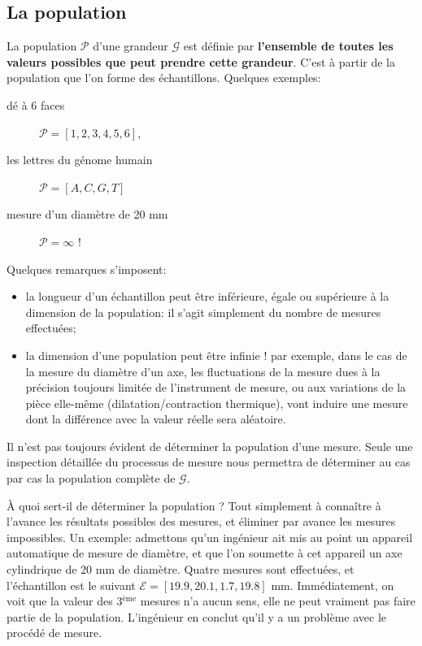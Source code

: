 \documentclass[main.tex]{subfiles}
\begin{document}
\subsection{La population}

La population $\mathcal{P}$ d'une grandeur $\mathcal{G}$ est définie par \textbf{l'ensemble de toutes les valeurs possibles que peut prendre cette grandeur}. C'est à partir de la population que l'on forme des échantillons. Quelques exemples:
\begin{description}
    \item[dé à 6 faces] $\mathcal{P}=[1,2,3,4,5,6]$,
    \item[les lettres du génome humain] $\mathcal{P}=[A,C,G,T]$
    \item[mesure d'un diamètre de 20 mm] $\mathcal{P}=\infty$ !
\end{description}
Quelques remarques s'imposent:
\begin{itemize}
    \item la longueur d'un échantillon peut être inférieure, égale ou supérieure à la dimension de la population: il s'agit simplement du nombre de mesures effectuées;
    \item la dimension d'une population peut être infinie ! par exemple, dans le cas de la mesure du diamètre d'un axe, les fluctuations de la mesure dues à la précision toujours limitée de l'instrument de mesure, ou aux variations de la pièce elle-même (dilatation/contraction thermique), vont induire une mesure dont la différence avec la valeur réelle sera aléatoire.
\end{itemize}
Il n'est pas toujours évident de déterminer la population d'une mesure. Seule une inspection détaillée du processus de mesure nous permettra de déterminer au cas par cas la population complète de $\mathcal{G}$.

À quoi sert-il de déterminer la population ? Tout simplement à connaître à l'avance les résultats possibles des mesures, et éliminer par avance les mesures impossibles. Un exemple: admettons qu'un ingénieur ait mis au point un appareil automatique de mesure de diamètre, et que l'on soumette à cet appareil un axe cylindrique de 20 mm de diamètre. Quatre mesures sont effectuées, et l'échantillon est le suivant $\mathcal{E}=[19.9,20.1,1.7,19.8]$ mm. Immédiatement, on voit que la valeur des 3$^\text{ème}$ mesures n'a aucun sens, elle ne peut vraiment pas faire partie de la population. L'ingénieur en conclut qu'il y a un problème avec le procédé de mesure.
\end{document}
